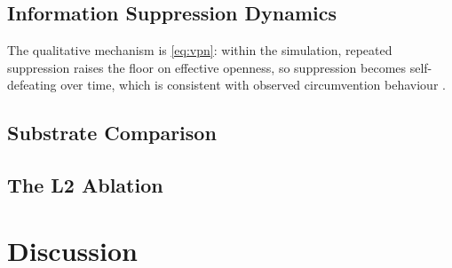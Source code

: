 \documentclass{ieeeaccess}
\newif\ifpendingvisible
\newcommand{\todo}[1]{%
  \ifpendingvisible\textcolor{red}{\textbf{[\MakeUppercase{#1}]}}\fi}
\begin{document}
\subsection{Information Suppression Dynamics}
\todo{PENDING CAMPAIGN: suppression counts and the terminal VPN floor
for every scenario in the final roster, at the campaign $N$.}
The qualitative mechanism is \eqref{eq:vpn}: within the simulation,
repeated suppression raises the floor on effective openness, so
suppression becomes self-defeating over time, which is consistent with
observed circumvention behaviour \cite{accessnow2023keepiton}.

\subsection{Substrate Comparison}
\todo{PENDING CAMPAIGN: the final-year indicator table under the
language-model elite layer against the deterministic rule-based layer,
for every scenario in the final roster, with the Mann-Whitney result for
each indicator. The submitted manuscript reported a maximum difference
below 0.003 across all indicators; that comparison must be re-executed
because every component of the pipeline downstream of the elite layer
has changed.}

\subsection{The L2 Ablation}
\todo{PENDING CAMPAIGN: the enforce-versus-observe ablation of the
constitutional layer on a civilian-chain scenario. Pre-committed
reporting position, decided before the run and recorded here so that it
cannot be chosen after the result is seen: if the ablation shows that
the suppression of coup probability under the designed constitution is
produced by the validator rather than by the constitutional provision,
that is the finding and it will be reported as such, and the mechanism
narrative in the submitted manuscript's discussion is withdrawn
accordingly. The ablation must run on a civilian chain, because on a
military chain the measured difference is structurally zero: that
encoding reaches no live L2 rule.}

\section{Discussion}
\label{sec:discussion}
\end{document}
